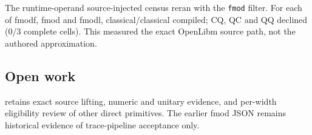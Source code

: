 The runtime-operand source-injected census reran with the \texttt{fmod}
filter. For each of fmodf, fmod and fmodl, classical/classical compiled;
CQ, QC and QQ declined (0/3 complete cells). This measured the exact
OpenLibm source path, not the authored approximation.

\subsection*{Open work}
 retains exact source lifting, numeric and unitary evidence,
and per-width eligibility review of other direct primitives. The earlier
fmod JSON remains historical evidence of trace-pipeline acceptance only.
